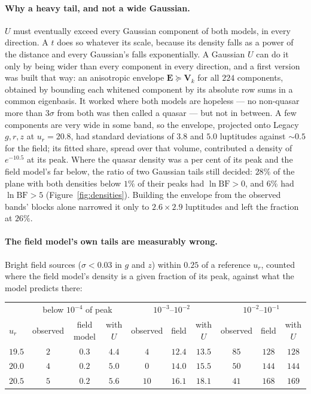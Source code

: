 \documentclass[11pt,a4paper]{article}
\begin{document}
\paragraph{Why a heavy tail, and not a wide Gaussian.} $U$ must eventually
exceed every Gaussian component of both models, in every direction. A $t$ does
so whatever its scale, because its density falls as a power of the distance and
every Gaussian's falls exponentially. A Gaussian $U$ can do it only by being
wider than every component in every direction, and a first version was built
that way: an anisotropic envelope $\mathbf E\succeq\mathbf V_k$ for all $224$
components, obtained by bounding each whitened component by its absolute row
sums in a common eigenbasis. It worked where both models are hopeless --- no
non-quasar more than $3\sigma$ from both was then called a quasar --- but not in
between. A few components are very wide in some band, so the envelope, projected
onto Legacy $g,r,z$ at $u_r=20.8$, had standard deviations of $3.8$ and $5.0$
luptitudes against $\sim0.5$ for the field; its fitted share, spread over that
volume, contributed a density of $e^{-10.5}$ at its peak. Where the quasar
density was a per cent of its peak and the field model's far below, the ratio of
two Gaussian tails still decided: $28\%$ of the plane with both densities below
$1\%$ of their peaks had $\ln\mathrm{BF}>0$, and $6\%$ had $\ln\mathrm{BF}>5$
(Figure~\ref{fig:densities}). Building the envelope from the observed bands'
blocks alone narrowed it only to $2.6\times2.9$ luptitudes and left the fraction
at $26\%$.

\paragraph{The field model's own tails are measurably wrong.} Bright field
sources ($\sigma<0.03$ in $g$ and $z$) within $0.25$ of a reference $u_r$,
counted where the field model's density is a given fraction of its peak, against
what the model predicts there:

\begin{center}
\small
\begin{tabular}{lccccccccc}
\toprule
 & \multicolumn{3}{c}{below $10^{-4}$ of peak} & \multicolumn{3}{c}{$10^{-3}$--$10^{-2}$} &
\multicolumn{3}{c}{$10^{-2}$--$10^{-1}$} \\
\cmidrule(lr){2-4}\cmidrule(lr){5-7}\cmidrule(lr){8-10}
$u_r$ & observed & field model & with $U$ & observed & field & with $U$ & observed & field & with $U$ \\
\midrule
$19.5$ & $2$ & $0.3$ & $4.4$ & $4$  & $12.4$ & $13.5$ & $85$ & $128$ & $128$ \\
$20.0$ & $4$ & $0.2$ & $5.0$ & $0$  & $14.0$ & $15.5$ & $50$ & $144$ & $144$ \\
$20.5$ & $5$ & $0.2$ & $5.6$ & $10$ & $16.1$ & $18.1$ & $41$ & $168$ & $169$ \\
\bottomrule
\end{tabular}
\end{center}
\end{document}
